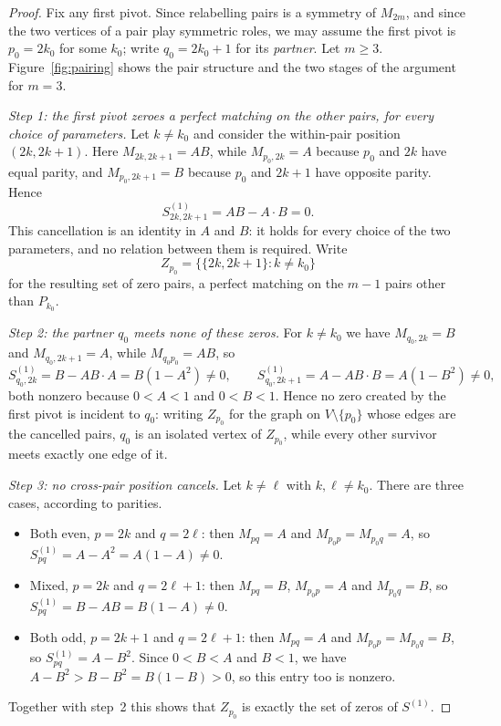 \documentclass[11pt]{article}
\theoremstyle{plain}
\theoremstyle{definition}
\theoremstyle{remark}
\begin{document}
\begin{aiblock}
\begin{proof}
Fix any first pivot. Since relabelling pairs is a symmetry of $M_{2m}$, and since the two vertices of
a pair play symmetric roles, we may assume the first pivot is $p_0=2k_0$ for some $k_0$; write
$q_0=2k_0+1$ for its \emph{partner}. Let $m\ge3$. Figure~\ref{fig:pairing} shows the pair structure
and the two stages of the argument for $m=3$.

\emph{Step 1: the first pivot zeroes a perfect matching on the other pairs, for every choice of
parameters.} Let $k\neq k_0$ and consider the within-pair position $(2k,2k+1)$. Here
$M_{2k,2k+1}=AB$, while $M_{p_0,2k}=A$ because $p_0$ and $2k$ have equal parity, and
$M_{p_0,2k+1}=B$ because $p_0$ and $2k+1$ have opposite parity. Hence
\[
S^{(1)}_{2k,2k+1}=AB-A\cdot B=0 .
\]
This cancellation is an identity in $A$ and $B$: it holds for every choice of the two parameters, and
no relation between them is required. Write
\[
Z_{p_0}=\bigl\{\{2k,2k+1\}: k\neq k_0\bigr\}
\]
for the resulting set of zero pairs, a perfect matching on the $m-1$ pairs other than $P_{k_0}$.

\emph{Step 2: the partner $q_0$ meets none of these zeros.} For $k\neq k_0$ we have
$M_{q_0,2k}=B$ and $M_{q_0,2k+1}=A$, while $M_{q_0p_0}=AB$, so
\[
S^{(1)}_{q_0,2k}=B-AB\cdot A=B(1-A^2)\neq0,
\qquad
S^{(1)}_{q_0,2k+1}=A-AB\cdot B=A(1-B^2)\neq0,
\]
both nonzero because $0<A<1$ and $0<B<1$. Hence no zero created by the first pivot is incident to $q_0$: writing $Z_{p_0}$ for the graph on $V\setminus \{p_0\}$ whose edges are the cancelled pairs, $q_0$ is an isolated vertex of $Z_{p_0}$, while every other survivor meets exactly one edge of it.


\emph{Step 3: no cross-pair position cancels.} Let $k\neq\ell$ with $k,\ell\neq k_0$. There are three
cases, according to parities.
\begin{itemize}
\item Both even, $p=2k$ and $q=2\ell$: then $M_{pq}=A$ and $M_{p_0p}=M_{p_0q}=A$, so
      $S^{(1)}_{pq}=A-A^2=A(1-A)\neq0$.
\item Mixed, $p=2k$ and $q=2\ell+1$: then $M_{pq}=B$, $M_{p_0p}=A$ and $M_{p_0q}=B$, so
      $S^{(1)}_{pq}=B-AB=B(1-A)\neq0$.
\item Both odd, $p=2k+1$ and $q=2\ell+1$: then $M_{pq}=A$ and $M_{p_0p}=M_{p_0q}=B$, so
      $S^{(1)}_{pq}=A-B^2$. Since $0<B<A$ and $B<1$, we have $A-B^2>B-B^2=B(1-B)>0$, so this
      entry too is nonzero.
\end{itemize}
Together with step~2 this shows that $Z_{p_0}$ is exactly the set of zeros of $S^{(1)}$.


\end{proof}
\end{aiblock}
\end{document}
